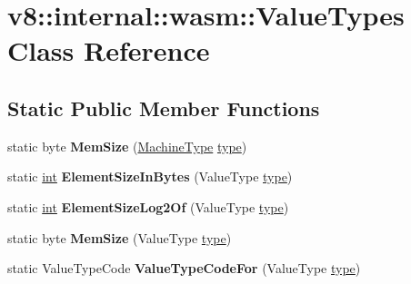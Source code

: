 \hypertarget{classv8_1_1internal_1_1wasm_1_1ValueTypes}{}\section{v8\+:\+:internal\+:\+:wasm\+:\+:Value\+Types Class Reference}
\label{classv8_1_1internal_1_1wasm_1_1ValueTypes}
\subsection*{Static Public Member Functions}
\begin{DoxyCompactItemize}
\item 
\mbox{\label{classv8_1_1internal_1_1wasm_1_1ValueTypes_a20497aa191679fb3ae8633e1fc0e1939}} 
static byte {\bfseries Mem\+Size} (\mbox{\hyperlink{classv8_1_1internal_1_1MachineType}{Machine\+Type}} \mbox{\hyperlink{classstd_1_1conditional_1_1type}{type}})
\item 
\mbox{\label{classv8_1_1internal_1_1wasm_1_1ValueTypes_addda2bb9c97d56807b3fc2f5fd9684dc}} 
static \mbox{\hyperlink{classint}{int}} {\bfseries Element\+Size\+In\+Bytes} (Value\+Type \mbox{\hyperlink{classstd_1_1conditional_1_1type}{type}})
\item 
\mbox{\label{classv8_1_1internal_1_1wasm_1_1ValueTypes_a7242d814732a908097387d34adb22e36}} 
static \mbox{\hyperlink{classint}{int}} {\bfseries Element\+Size\+Log2\+Of} (Value\+Type \mbox{\hyperlink{classstd_1_1conditional_1_1type}{type}})
\item 
\mbox{\label{classv8_1_1internal_1_1wasm_1_1ValueTypes_ac4791cbe7fd8a1a05d1efa5433539965}} 
static byte {\bfseries Mem\+Size} (Value\+Type \mbox{\hyperlink{classstd_1_1conditional_1_1type}{type}})
\item 
\mbox{\label{classv8_1_1internal_1_1wasm_1_1ValueTypes_a25392d9233ecf5bb8355f61905736855}} 
static Value\+Type\+Code {\bfseries Value\+Type\+Code\+For} (Value\+Type \mbox{\hyperlink{classstd_1_1conditional_1_1type}{type}})
\item 
\mbox{\label{classv8_1_1internal_1_1wasm_1_1ValueTypes_ad4a223462fcc986217e532360fd4afd7}} 

\end{DoxyCompactItemize}
